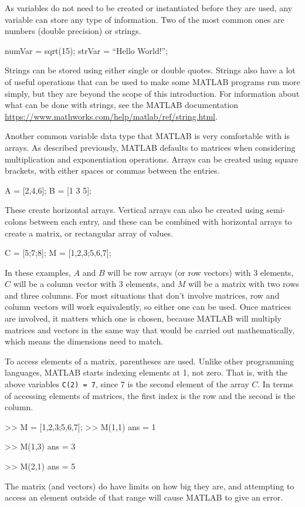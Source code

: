 As variables do not need to be created or instantiated before they are used, any variable can store any type of information. Two of the most common ones are numbers (double precision) or strings.

\begin{matlab}
numVar = sqrt(15);
strVar = ``Hello World!'';
\end{matlab}

Strings can be stored using either single or double quotes. Strings also have a lot of useful operations that can be used to make some MATLAB programs run more simply, but they are beyond the scope of this introduction. For information about what can be done with strings, see the MATLAB documentation \url{https://www.mathworks.com/help/matlab/ref/string.html}.

Another common variable data type that MATLAB is very comfortable with is arrays. As described previously, MATLAB defaults to matrices when considering multiplication and exponentiation operations. Arrays can be created using square brackets, with either spaces or commas between the entries.
\begin{matlab}
A = [2,4,6];
B = [1 3 5];
\end{matlab}
These create horizontal arrays. Vertical arrays can also be created using semi-colons between each entry, and these can be combined with horizontal arrays to create a matrix, or rectangular array of values.

\begin{matlab}
C = [5;7;8];
M = [1,2,3;5,6,7];
\end{matlab}
In these examples, $A$ and $B$ will be row arrays (or row vectors) with 3 elements, $C$ will be a column vector with $3$ elements, and $M$ will be a matrix with two rows and three columns. For most situations that don't involve matrices, row and column vectors will work equivalently, so either one can be used. Once matrices are involved, it matters which one is chosen, because MATLAB will multiply matrices and vectors in the same way that would be carried out mathematically, which means the dimensions need to match.

To access elements of a matrix, parentheses are used. Unlike other programming languages, MATLAB starts indexing elements at 1, not zero. That is, with the above variables \texttt{C(2) = 7}, since $7$ is the second element of the array $C$. In terms of accessing elements of matrices, the first index is the row and the second is the column.
\begin{matlab}
>> M = [1,2,3;5,6,7];
>> M(1,1)
ans =
     1

>> M(1,3)
ans =
     3

>> M(2,1)
ans =
     5
\end{matlab}
The matrix (and vectors) do have limits on how big they are, and attempting to access an element outside of that range will cause MATLAB to give an error.

